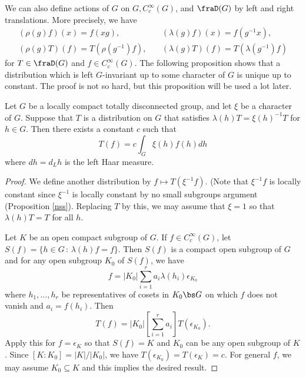 We can also define actions of $G$ on $G, C_{c}^{\infty}(G)$, and $\fraD(G)$ by left and right translations. More precisely, we have
\begin{align*}
(\rho(g) f)(x) = f(xg), &\quad (\lambda(g)f)(x) = f(g^{-1}x), \\
(\rho(g)T)(f) = T(\rho(g^{-1})f), &\quad (\lambda(g)T)(f) = T(\lambda(g^{-1})f)
\end{align*}
for $T\in \fraD(G)$ and $f\in C_{c}^{\infty}(G)$. 
The following proposition shows that a distribution which is left $G$-invariant up to some character of $G$  is unique up to constant. The proof is not so hard, but this proposition will be used a lot later. 
\begin{proposition}
\label{distuniq}
Let $G$ be a locally compact totally disconnected group, and let $\xi$ be a character of $G$. Suppose that $T$ is a distribution on $G$ that satisfies $\lambda(h)T = \xi(h)^{-1}T$ for $h\in G$. Then there exists a constant $c$ such that
$$
T(f) = c\int_{G} \xi(h)f(h)dh
$$
where $dh = d_{L}h$ is the left Haar measure. 
\end{proposition}
\begin{proof}
We define another distribution by $f\mapsto T(\xi^{-1}f)$. (Note that $\xi^{-1}f$ is locally constant since $\xi^{-1}$ is locally constant by no small subgroups argument (Proposition \ref{nss}). Replacing $T$ by this, we may assume that $\xi = 1$ so that $\lambda(h)T = T$ for all $h$. 

Let $K$ be an open compact subgroup of $G$. If $f\in C_{c}^{\infty}(G)$, let $S(f) = \{h\in G\,:\, \lambda(h)f = f\}$. 
Then $S(f)$ is a compact open subgroup of $G$ and for any open subgroup $K_0$ of $S(f)$, we have 
$$
f = |K_{0}|\sum_{i=1}^{r} a_{i}\lambda(h_{i})\epsilon_{K_{0}}
$$
where $h_{1}, \dots, h_{r}$ be representatives of cosets in $K_{0}\bs G$ on which $f$ does not vanish and $a_{i} = f(h_{i})$. 
Then 
$$
T(f) = |K_{0}| \left[ \sum_{i=1}^{r}a_{i}\right] T(\epsilon_{K_{0}}).
$$
Apply this for $f = \epsilon_K$ so that $S(f) = K$ and $K_{0}$ can be any open subgroup of $K$. 
Since $[K:K_{0}] = |K|/|K_{0}|$, we have $T(\epsilon_{K_{0}}) = T(\epsilon_K) = c$. 
For general $f$, we may assume $K_{0} \subseteq K$ and this implies the desired result. 
\end{proof}

